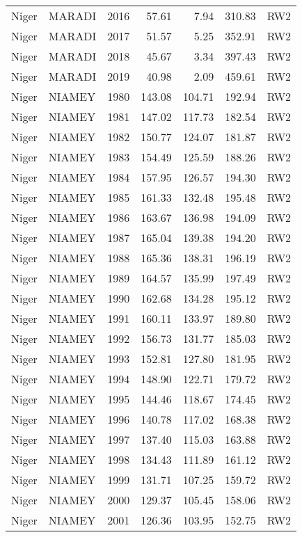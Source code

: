 \begin{longtable}{lllrrrl}
  Niger & MARADI & 2016 & 57.61 & 7.94 & 310.83 & RW2 \\ 
  Niger & MARADI & 2017 & 51.57 & 5.25 & 352.91 & RW2 \\ 
  Niger & MARADI & 2018 & 45.67 & 3.34 & 397.43 & RW2 \\ 
  Niger & MARADI & 2019 & 40.98 & 2.09 & 459.61 & RW2 \\ 
  Niger & NIAMEY & 1980 & 143.08 & 104.71 & 192.94 & RW2 \\ 
  Niger & NIAMEY & 1981 & 147.02 & 117.73 & 182.54 & RW2 \\ 
  Niger & NIAMEY & 1982 & 150.77 & 124.07 & 181.87 & RW2 \\ 
  Niger & NIAMEY & 1983 & 154.49 & 125.59 & 188.26 & RW2 \\ 
  Niger & NIAMEY & 1984 & 157.95 & 126.57 & 194.30 & RW2 \\ 
  Niger & NIAMEY & 1985 & 161.33 & 132.48 & 195.48 & RW2 \\ 
  Niger & NIAMEY & 1986 & 163.67 & 136.98 & 194.09 & RW2 \\ 
  Niger & NIAMEY & 1987 & 165.04 & 139.38 & 194.20 & RW2 \\ 
  Niger & NIAMEY & 1988 & 165.36 & 138.31 & 196.19 & RW2 \\ 
  Niger & NIAMEY & 1989 & 164.57 & 135.99 & 197.49 & RW2 \\ 
  Niger & NIAMEY & 1990 & 162.68 & 134.28 & 195.12 & RW2 \\ 
  Niger & NIAMEY & 1991 & 160.11 & 133.97 & 189.80 & RW2 \\ 
  Niger & NIAMEY & 1992 & 156.73 & 131.77 & 185.03 & RW2 \\ 
  Niger & NIAMEY & 1993 & 152.81 & 127.80 & 181.95 & RW2 \\ 
  Niger & NIAMEY & 1994 & 148.90 & 122.71 & 179.72 & RW2 \\ 
  Niger & NIAMEY & 1995 & 144.46 & 118.67 & 174.45 & RW2 \\ 
  Niger & NIAMEY & 1996 & 140.78 & 117.02 & 168.38 & RW2 \\ 
  Niger & NIAMEY & 1997 & 137.40 & 115.03 & 163.88 & RW2 \\ 
  Niger & NIAMEY & 1998 & 134.43 & 111.89 & 161.12 & RW2 \\ 
  Niger & NIAMEY & 1999 & 131.71 & 107.25 & 159.72 & RW2 \\ 
  Niger & NIAMEY & 2000 & 129.37 & 105.45 & 158.06 & RW2 \\ 
  Niger & NIAMEY & 2001 & 126.36 & 103.95 & 152.75 & RW2 \\ 

\end{longtable}
